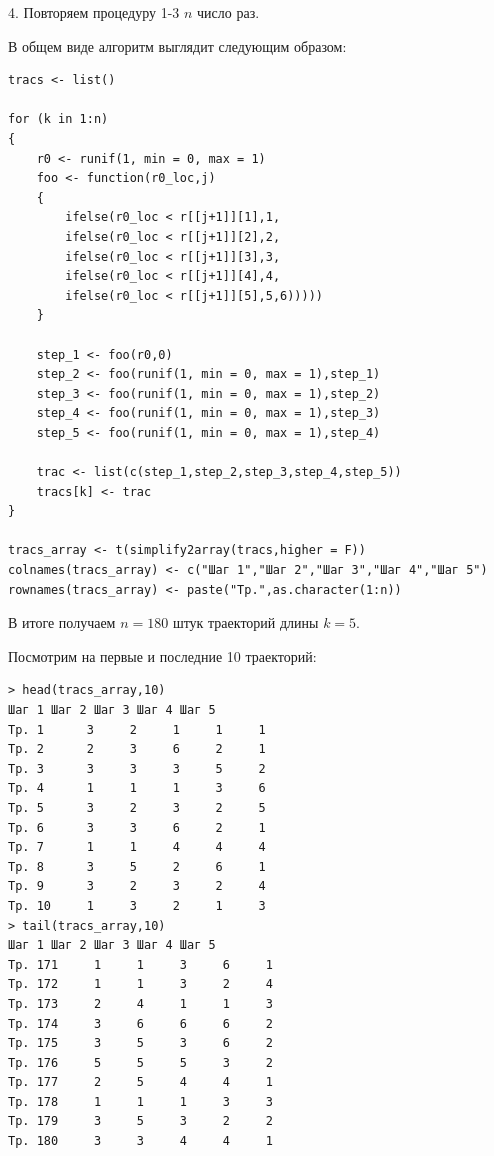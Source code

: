 \documentclass[14pt,a4paper]{scrartcl}
\begin{document}
4. Повторяем процедуру 1-3 $n$ число раз.

В общем виде алгоритм выглядит следующим образом:
\begin{verbatim}
tracs <- list()

for (k in 1:n)
{
	r0 <- runif(1, min = 0, max = 1)
	foo <- function(r0_loc,j)
	{
		ifelse(r0_loc < r[[j+1]][1],1,
		ifelse(r0_loc < r[[j+1]][2],2,
		ifelse(r0_loc < r[[j+1]][3],3,
		ifelse(r0_loc < r[[j+1]][4],4,
		ifelse(r0_loc < r[[j+1]][5],5,6)))))
	}
	
	step_1 <- foo(r0,0)
	step_2 <- foo(runif(1, min = 0, max = 1),step_1)
	step_3 <- foo(runif(1, min = 0, max = 1),step_2)
	step_4 <- foo(runif(1, min = 0, max = 1),step_3)
	step_5 <- foo(runif(1, min = 0, max = 1),step_4)
	
	trac <- list(c(step_1,step_2,step_3,step_4,step_5))
	tracs[k] <- trac
}

tracs_array <- t(simplify2array(tracs,higher = F))
colnames(tracs_array) <- c("Шаг 1","Шаг 2","Шаг 3","Шаг 4","Шаг 5")
rownames(tracs_array) <- paste("Тр.",as.character(1:n))
\end{verbatim}

В итоге получаем $n=180$ штук траекторий длины $k=5$.

Посмотрим на первые и последние 10 траекторий:

\begin{verbatim}
> head(tracs_array,10)
Шаг 1 Шаг 2 Шаг 3 Шаг 4 Шаг 5
Тр. 1      3     2     1     1     1
Тр. 2      2     3     6     2     1
Тр. 3      3     3     3     5     2
Тр. 4      1     1     1     3     6
Тр. 5      3     2     3     2     5
Тр. 6      3     3     6     2     1
Тр. 7      1     1     4     4     4
Тр. 8      3     5     2     6     1
Тр. 9      3     2     3     2     4
Тр. 10     1     3     2     1     3
> tail(tracs_array,10)
Шаг 1 Шаг 2 Шаг 3 Шаг 4 Шаг 5
Тр. 171     1     1     3     6     1
Тр. 172     1     1     3     2     4
Тр. 173     2     4     1     1     3
Тр. 174     3     6     6     6     2
Тр. 175     3     5     3     6     2
Тр. 176     5     5     5     3     2
Тр. 177     2     5     4     4     1
Тр. 178     1     1     1     3     3
Тр. 179     3     5     3     2     2
Тр. 180     3     3     4     4     1
\end{verbatim}
\end{document}
